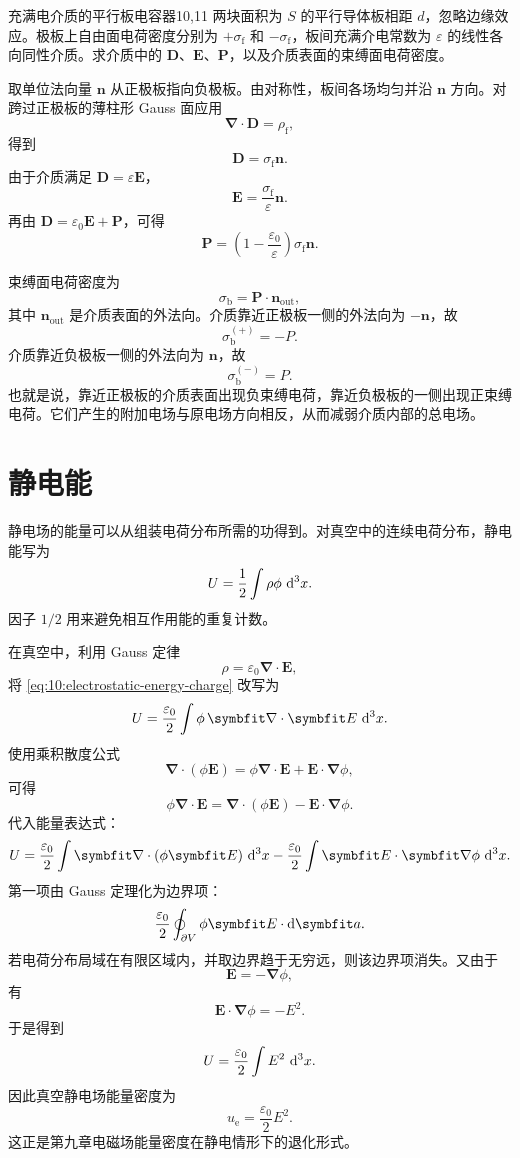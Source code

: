 \begin{example}{充满电介质的平行板电容器}{10,11}
两块面积为 $S$ 的平行导体板相距 $d$，忽略边缘效应。极板上自由面电荷密度分别为 $+\sigma_{\mathrm{f}}$ 和 $-\sigma_{\mathrm{f}}$，板间充满介电常数为 $\varepsilon$ 的线性各向同性介质。求介质中的 $\bm{D}$、$\bm{E}$、$\bm{P}$，以及介质表面的束缚面电荷密度。

\begin{solution}
取单位法向量 $\bm{n}$ 从正极板指向负极板。由对称性，板间各场均匀并沿 $\bm{n}$ 方向。对跨过正极板的薄柱形 Gauss 面应用
\[
\bm{\nabla}\cdot\bm{D}=\rho_{\mathrm{f}},
\]
得到
\[
\bm{D}
=
\sigma_{\mathrm{f}}\bm{n}.
\]
由于介质满足 $\bm{D}=\varepsilon\bm{E}$，
\[
\bm{E}
=
\frac{\sigma_{\mathrm{f}}}{\varepsilon}\bm{n}.
\]
再由 $\bm{D}=\varepsilon_{0}\bm{E}+\bm{P}$，可得
\[
\bm{P}
=
\left(
1-\frac{\varepsilon_{0}}{\varepsilon}
\right)
\sigma_{\mathrm{f}}\bm{n}.
\]

束缚面电荷密度为
\[
\sigma_{\mathrm{b}}
=
\bm{P}\cdot\bm{n}_{\mathrm{out}},
\]
其中 $\bm{n}_{\mathrm{out}}$ 是介质表面的外法向。介质靠近正极板一侧的外法向为 $-\bm{n}$，故
\[
\sigma_{\mathrm{b}}^{(+)}
=
-P.
\]
介质靠近负极板一侧的外法向为 $\bm{n}$，故
\[
\sigma_{\mathrm{b}}^{(-)}
=
P.
\]
也就是说，靠近正极板的介质表面出现负束缚电荷，靠近负极板的一侧出现正束缚电荷。它们产生的附加电场与原电场方向相反，从而减弱介质内部的总电场。
\end{solution}
\end{example}

\section{静电能}

静电场的能量可以从组装电荷分布所需的功得到。对真空中的连续电荷分布，静电能写为
\begin{equation}
	U
	=
	\frac{1}{2}
	\int
	\rho\phi\,\mathop{}\!\mathrm{d}^{3}x.
	\label{eq:10:electrostatic-energy-charge}
\end{equation}
因子 $1/2$ 用来避免相互作用能的重复计数。

在真空中，利用 Gauss 定律
\[
\rho
=
\varepsilon_{0}\bm{\nabla}\cdot\bm{E},
\]
将 \eqref{eq:10:electrostatic-energy-charge} 改写为
\[
U
=
\frac{\varepsilon_{0}}{2}
\int
\phi\,\bm{\nabla}\cdot\bm{E}
\,\dif^{3}x.
\]
使用乘积散度公式
\[
\bm{\nabla}\cdot(\phi\bm{E})
=
\phi\bm{\nabla}\cdot\bm{E}
+
\bm{E}\cdot\bm{\nabla}\phi,
\]
可得
\[
\phi\bm{\nabla}\cdot\bm{E}
=
\bm{\nabla}\cdot(\phi\bm{E})
-
\bm{E}\cdot\bm{\nabla}\phi.
\]
代入能量表达式：
\[
U
=
\frac{\varepsilon_{0}}{2}
\int
\bm{\nabla}\cdot(\phi\bm{E})
\,\dif^{3}x
-
\frac{\varepsilon_{0}}{2}
\int
\bm{E}\cdot\bm{\nabla}\phi
\,\dif^{3}x.
\]
第一项由 Gauss 定理化为边界项：
\[
\frac{\varepsilon_{0}}{2}
\oint_{\partial V}
\phi\bm{E}\cdot\dif\bm{a}.
\]
若电荷分布局域在有限区域内，并取边界趋于无穷远，则该边界项消失。又由于
\[
\bm{E}
=
-\bm{\nabla}\phi,
\]
有
\[
\bm{E}\cdot\bm{\nabla}\phi
=
-E^{2}.
\]
于是得到
\begin{equation}
	U
	=
	\frac{\varepsilon_{0}}{2}
	\int
	E^{2}\,\mathop{}\!\mathrm{d}^{3}x.
	\label{eq:10:electrostatic-energy-field}
\end{equation}
因此真空静电场能量密度为
\[
u_{\mathrm{e}}
=
\frac{\varepsilon_{0}}{2}E^{2}.
\]
这正是第九章电磁场能量密度在静电情形下的退化形式。


